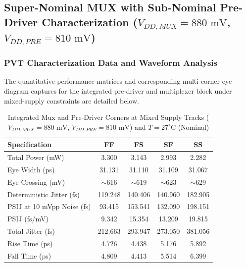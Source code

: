 \clearpage
\subsection*{Super-Nominal MUX with Sub-Nominal Pre-Driver Characterization ($V_{DD,MUX} = 880\text{ mV}$, $V_{DD,PRE} = 810\text{ mV}$)}
\subsubsection*{PVT Characterization Data and Waveform Analysis}

The quantitative performance matrices and corresponding multi-corner eye diagram captures for the integrated pre-driver and multiplexer block under mixed-supply constraints are detailed below.

\begin{table}[H]
    \centering
    \renewcommand{\arraystretch}{1.3}
    \setlength{\tabcolsep}{10pt}
    \begin{tabular}{|l|c|c|c|c|}
        \hline
        Specification & FF & FS & SF & SS \\ \hline
        Total Power (mW) & 3.300 & 3.143 & 2.993 & 2.282 \\ \hline
        Eye Width (ps) & 31.131 & 31.110 & 31.109 & 31.067 \\ \hline
        Eye Crossing (mV) & $\sim$616 & $\sim$619 & $\sim$623 & $\sim$629 \\ \hline
        Deterministic Jitter (fs) & 119.248 & 140.406 & 140.960 & 182.905 \\ \hline
        PSIJ at 10 mVpp Noise (fs) & 93.415 & 153.541 & 132.090 & 198.151 \\ \hline
        PSIJ (fs/mV) & 9.342 & 15.354 & 13.209 & 19.815 \\ \hline
        Total Jitter (fs) & 212.663 & 293.947 & 273.050 & 381.056 \\ \hline
        Rise Time (ps) & 4.726 & 4.438 & 5.176 & 5.892 \\ \hline
        Fall Time (ps) & 4.809 & 4.413 & 5.514 & 6.399 \\ \hline
    \end{tabular}
    \vspace{2mm}
    \caption{Integrated Mux and Pre-Driver Corners at Mixed Supply Tracks ($V_{DD,MUX} = 880\text{ mV}$, $V_{DD,PRE} = 810\text{ mV}$) and $T = 27^{\circ}\text{C}$ (Nominal)}
    \label{tab:integrated_corners_27}
\end{table}

